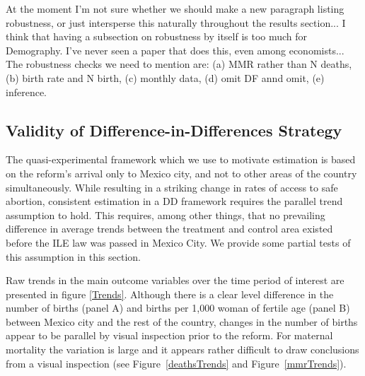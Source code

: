 \documentclass[a4paper, 11pt]{article}
\begin{document}
\begin{spacing}{2}

At the moment I'm not sure whether we should make a new paragraph listing robustness, or just intersperse this naturally throughout the results section...  I think that having a subsection on robustness by itself is too much for Demography.  I've never seen a paper that does this, even among economists...  The robustness checks we need to mention are: (a) MMR rather than N deaths, (b) birth rate and N birth, (c) monthly data, (d) omit DF annd omit, (e) inference.

\subsection{Validity of Difference-in-Differences Strategy}\label{parallel}
The quasi-experimental framework which we use to motivate estimation is based on the reform's arrival only to Mexico city, and not to other areas of the country simultaneously.  While resulting in a striking change in rates of access to safe abortion, consistent estimation in a DD framework requires the parallel trend assumption to hold.  This requires, among other things, that no prevailing difference in average trends between the treatment and control area existed before the ILE law was passed in Mexico City. We provide some partial tests of this assumption in this section.

Raw trends in the main outcome variables over the time period of interest are presented in figure \ref{Trends}. Although there is a clear level difference in the number of births (panel A) and births per 1,000 woman of fertile age (panel B) between Mexico city and the rest of the country, changes in the number of births appear to be parallel by visual inspection prior to the reform. For maternal mortality the variation is large and it appears rather difficult to draw conclusions from a visual inspection (see Figure~\ref{deathsTrends} and Figure~\ref{mmrTrends}).  


\end{spacing}
\end{document}
